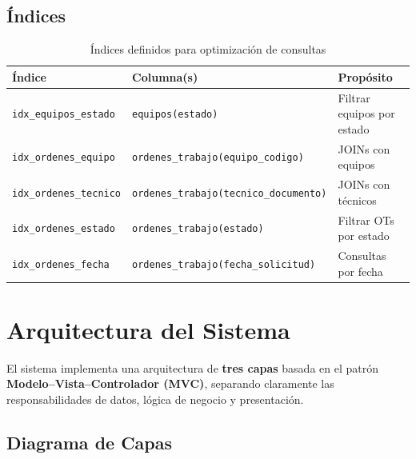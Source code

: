 \documentclass[12pt, a4paper]{article}
\begin{document}
\subsection{Índices}

\begin{table}[H]
    \centering
    \begin{tabularx}{\textwidth}{l X l}
        \toprule
        \textbf{Índice} & \textbf{Columna(s)} & \textbf{Propósito} \\
        \midrule
        \texttt{idx\_equipos\_estado} & \texttt{equipos(estado)} & Filtrar equipos por estado \\
        \texttt{idx\_ordenes\_equipo} & \texttt{ordenes\_trabajo(equipo\_codigo)} & JOINs con equipos \\
        \texttt{idx\_ordenes\_tecnico} & \texttt{ordenes\_trabajo(tecnico\_documento)} & JOINs con técnicos \\
        \texttt{idx\_ordenes\_estado} & \texttt{ordenes\_trabajo(estado)} & Filtrar OTs por estado \\
        \texttt{idx\_ordenes\_fecha} & \texttt{ordenes\_trabajo(fecha\_solicitud)} & Consultas por fecha \\
        \bottomrule
    \end{tabularx}
    \caption{Índices definidos para optimización de consultas}
\end{table}

\newpage
\section{Arquitectura del Sistema}

El sistema implementa una arquitectura de \textbf{tres capas} basada en el patrón \textbf{Modelo--Vista--Controlador (MVC)}, separando claramente las responsabilidades de datos, lógica de negocio y presentación.

\subsection{Diagrama de Capas}
\end{document}
